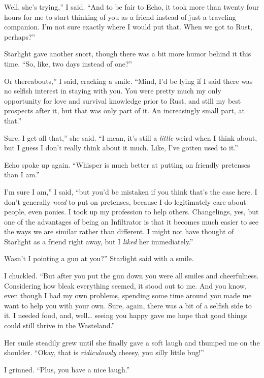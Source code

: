 \leavevmode{}Well, she’s trying,” I said. “And to be fair to Echo, it took more than twenty four hours for me to start thinking of you as a friend instead of just a traveling companion. I’m not sure exactly where I would put that. When we got to Rust, perhaps?”

Starlight gave another snort, though there was a bit more humor behind it this time. “So, like, two days instead of one?”

\leavevmode{}Or thereabouts,” I said, cracking a smile. “Mind, I’d be lying if I said there was no selfish interest in staying with you. You were pretty much my only opportunity for love and survival knowledge prior to Rust, and still my best prospects after it, but that was only part of it. An increasingly small part, at that.”

\leavevmode{}Sure, I get all that,” she said. “I mean, it’s still a \textit{little} weird when I think about, but I guess I don’t really think about it much. Like, I’ve gotten used to it.”

Echo spoke up again. “Whisper is much better at putting on friendly pretenses than I am.”

\leavevmode{}I’m sure I am,” I said, “but you’d be mistaken if you think that’s the case here. I don’t generally \textit{need} to put on pretenses, because I do legitimately care about people, even ponies. I took up my profession to help others. Changelings, yes, but one of the advantages of being an Infiltrator is that it becomes much easier to see the ways we are similar rather than different. I might not have thought of Starlight as a friend right away, but I \textit{liked} her immediately.”

\leavevmode{}Wasn’t I pointing a gun at you?” Starlight said with a smile.

I chuckled. “But after you put the gun down you were all smiles and cheerfulness. Considering how bleak everything seemed, it stood out to me. And you know, even though I had my own problems, spending some time around you made me want to help you with your own. Sure, again, there was a bit of a selfish side to it. I needed food, and, well… seeing you happy gave me hope that good things could still thrive in the Wasteland.”

Her smile steadily grew until she finally gave a soft laugh and thumped me on the shoulder. “Okay, that is \textit{ridiculously} cheesy, you silly little bug!”

I grinned. “Plus, you have a nice laugh.”

